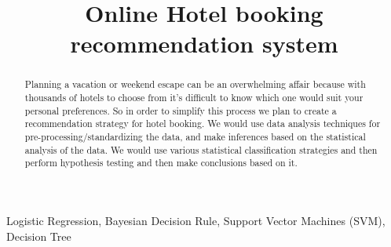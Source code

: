 \documentclass[conference]{IEEEtran}
\begin{document}
\title{\LARGE Online Hotel booking recommendation system}


 \author{
}

\maketitle

\begin{abstract}
Planning a vacation or weekend escape can be an overwhelming affair because with thousands of hotels to choose from it’s difficult to know which one would suit your personal preferences. So in order to simplify this process we plan to create a recommendation strategy for hotel booking. We would use data analysis techniques for pre-processing/standardizing the data, and make inferences based on the statistical analysis of the data. We would use various statistical classification strategies and then perform hypothesis testing and then make conclusions based on it.
\end{abstract}

\IEEEoverridecommandlockouts
\begin{keywords}
Logistic Regression, Bayesian Decision Rule, Support Vector Machines (SVM), Decision Tree
\end{keywords}

\IEEEpeerreviewmaketitle


\end{document}
